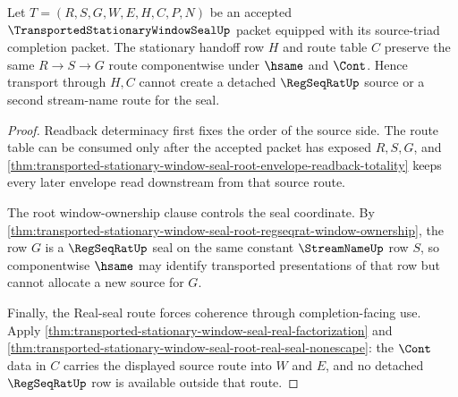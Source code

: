 \begin{theorem}
\label{thm:transported-stationary-window-seal-stationary-transport-coherence}
Let $T=(R,S,G,W,E,H,C,P,N)$ be an accepted $\TransportedStationaryWindowSealUp$ packet equipped with its source-triad completion packet. The stationary handoff row $H$ and route table $C$ preserve the same $R \to S \to G$ route componentwise under $\hsame$ and $\Cont$. Hence transport through $H,C$ cannot create a detached $\RegSeqRatUp$ source or a second stream-name route for the seal.
\end{theorem}
\begin{proof}
Readback determinacy first fixes the order of the source side. The route table can be consumed only after the accepted packet has exposed $R,S,G$, and \autoref{thm:transported-stationary-window-seal-root-envelope-readback-totality} keeps every later envelope read downstream from that source route.

The root window-ownership clause controls the seal coordinate. By \autoref{thm:transported-stationary-window-seal-root-regseqrat-window-ownership}, the row $G$ is a $\RegSeqRatUp$ seal on the same constant $\StreamNameUp$ row $S$, so componentwise $\hsame$ may identify transported presentations of that row but cannot allocate a new source for $G$.

Finally, the Real-seal route forces coherence through completion-facing use. Apply \autoref{thm:transported-stationary-window-seal-real-factorization} and \autoref{thm:transported-stationary-window-seal-root-real-seal-nonescape}: the $\Cont$ data in $C$ carries the displayed source route into $W$ and $E$, and no detached $\RegSeqRatUp$ row is available outside that route.
\end{proof}

